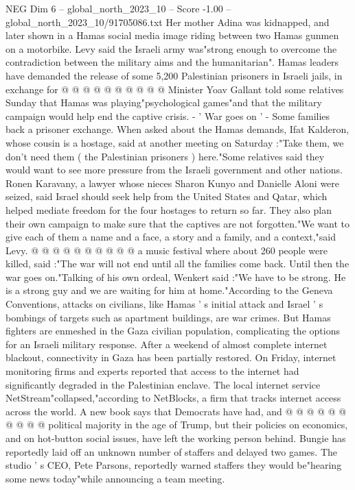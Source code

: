 \begin{textsample}{NEG Dim 6 – global\_north\_2023\_10 – Score -1.00 – global\_north\_2023\_10/91705086.txt}
Her mother Adina was kidnapped, and later shown in a Hamas social media image riding between two Hamas gunmen on a motorbike.
Levy said the Israeli army was"strong enough to overcome the contradiction between the military aims and the humanitarian".
Hamas leaders have demanded the release of some 5,200 Palestinian prisoners in Israeli jails, in exchange for @ @ @ @ @ @ @ @ @ @ Minister Yoav Gallant told some relatives Sunday that Hamas was playing"psychological games"and that the military campaign would help end the captive crisis. - ' War goes on ' - Some families back a prisoner exchange.
When asked about the Hamas demands, Ifat Kalderon, whose cousin is a hostage, said at another meeting on Saturday :"Take them, we don't need them ( the Palestinian prisoners ) here."Some relatives said they would want to see more pressure from the Israeli government and other nations.
Ronen Karavany, a lawyer whose nieces Sharon Kunyo and Danielle Aloni were seized, said Israel should seek help from the United States and Qatar, which helped mediate freedom for the four hostages to return so far.
They also plan their own campaign to make sure that the captives are not forgotten."We want to give each of them a name and a face, a story and a family, and a context,"said Levy. @ @ @ @ @ @ @ @ @ @ a music festival where about 260 people were killed, said :"The war will not end until all the families come back.
Until then the war goes on."Talking of his own ordeal, Wenkert said :"We have to be strong.
He is a strong guy and we are waiting for him at home."According to the Geneva Conventions, attacks on civilians, like Hamas ' s initial attack and Israel ' s bombings of targets such as apartment buildings, are war crimes.
But Hamas fighters are enmeshed in the Gaza civilian population, complicating the options for an Israeli military response.
After a weekend of almost complete internet blackout, connectivity in Gaza has been partially restored.
On Friday, internet monitoring firms and experts reported that access to the internet had significantly degraded in the Palestinian enclave.
The local internet service NetStream"collapsed,"according to NetBlocks, a firm that tracks internet access across the world.
A new book says that Democrats have had, and @ @ @ @ @ @ @ @ @ @ political majority in the age of Trump, but their policies on economics, and on hot-button social issues, have left the working person behind.
Bungie has reportedly laid off an unknown number of staffers and delayed two games.
The studio ' s CEO, Pete Parsons, reportedly warned staffers they would be"hearing some news today"while announcing a team meeting.

\end{textsample}
